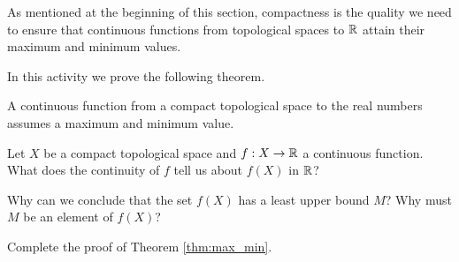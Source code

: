 \begin{comment}

\ActivitySolution Let $M = 1$. For any $a_1, a_2 \in \Z$, we have that $d(a_1,a_2) \leq 1$. So $\Z$ is bounded. Every subset of a metric space with the discrete metric is closed, so $\Z$ is closed.  But $\Z$ is not compact since open cover with no finite sub-cover is $\{\{n\}\}_{n \in \Z}$. 

\end{comment}
 

\label{sec_compact_app}

As mentioned at the beginning of this section, compactness is the quality we need to ensure that continuous functions from topological spaces to $\mathbb{R}$ attain their maximum and minimum values.


\begin{activity} In this activity we prove the following theorem. 

\begin{theorem} \label{thm:max_min} A continuous function from a compact topological space to the real numbers assumes a maximum and minimum value. 
\end{theorem}

\ba
\item Let $X$ be a compact topological space and $f: X \to \mathbb{R}$ a continuous function. What does the continuity of $f$ tell us about $f(X)$ in $\mathbb{R}$? 

\item Why can we conclude that the set $f(X)$ has a least upper bound $M$? Why must $M$ be an element of $f(X)$?

\item Complete the proof of Theorem \ref{thm:max_min}.

\ea

\end{activity}

\begin{comment}

\ActivitySolution

\ba
\item Since $f$ is continuous, we know that $f(X)$ is compact in $\R$ by Activity 16.2. 

\item By the Heine-Borel Theorem, it follows that $f(X)$ is closed and bounded. Since $f(X)$ is bounded, there is a least upper bound $M$ for $f(X)$. Now $M$ is a limit point of $f(X)$ and $f(X)$ is closed, so $M \in f(X)$.

\item Similarly, $f(X)$ contains its greatest lower bound $m$. Thus, $f$ assumes a maximum value $M$ and a minimum value $m$ in $\R$.

\ea


\end{comment}


